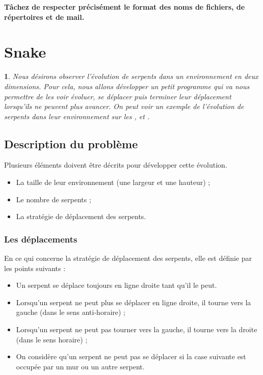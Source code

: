 \documentclass[a4paper]{article}
\newtheorem{Exo}{{\sffamily{Exercice}}}
\begin{document}
			\textbf{Tâchez de respecter précisément le format des noms de fichiers, de répertoires et de mail.}
		
			\newpage

	\section{Snake}
		\begin{Exo}
			Nous désirons observer l'évolution de serpents dans un environnement en deux dimensions.
			Pour cela, nous allons développer un petit programme qui va nous permettre de les voir évoluer, se déplacer puis terminer leur déplacement lorsqu'ils ne peuvent plus avancer.
			On peut voir un exemple de l'évolution de serpents dans leur environnement sur les ,  et .
		\end{Exo}


		\subsection{Description du problème}
			Plusieurs éléments doivent être décrits pour développer cette évolution.
			\begin{itemize}
				\item La taille de leur environnement (une largeur et une hauteur) ;
				\item Le nombre de serpents ;
				\item La stratégie de déplacement des serpents.
			\end{itemize}

			\subsubsection{Les déplacements}
				En ce qui concerne la stratégie de déplacement des serpents, elle est définie par les points suivants :
				\begin{itemize}
					\item Un serpent se déplace toujours en ligne droite tant qu'il le peut.
					\item Lorsqu'un serpent ne peut plus se déplacer en ligne droite, il tourne vers la gauche (\ie dans le sens anti-horaire) ;
					\item Lorsqu'un serpent ne peut pas tourner vers la gauche, il tourne vers la droite (\ie dans le sens horaire) ;
					\item On considère qu'un serpent ne peut pas se déplacer si la case suivante est occupée par un mur ou un autre serpent.
				\end{itemize}
\end{document}
